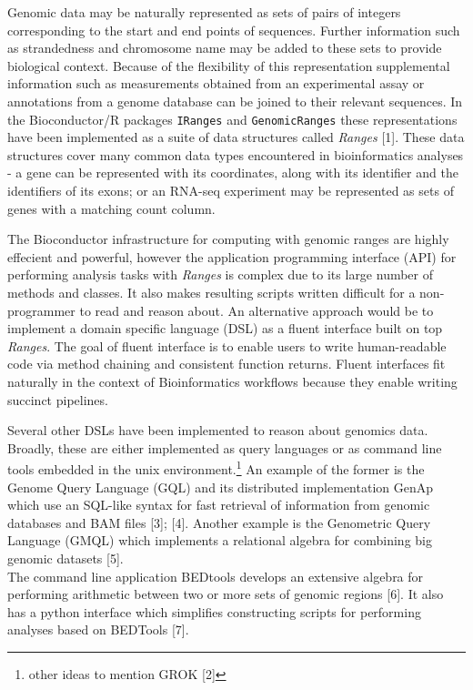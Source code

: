 \documentclass[10pt,letterpaper]{article}
\begin{document}
Genomic data may be naturally represented as sets of pairs of integers
corresponding to the start and end points of sequences. Further
information such as strandedness and chromosome name may be added to
these sets to provide biological context. Because of the flexibility of
this representation supplemental information such as measurements
obtained from an experimental assay or annotations from a genome
database can be joined to their relevant sequences. In the
Bioconductor/R packages \texttt{IRanges} and \texttt{GenomicRanges}
these representations have been implemented as a suite of data
structures called \emph{Ranges} {[}1{]}. These data structures cover
many common data types encountered in bioinformatics analyses - a gene
can be represented with its coordinates, along with its identifier and
the identifiers of its exons; or an RNA-seq experiment may be
represented as sets of genes with a matching count column.

The Bioconductor infrastructure for computing with genomic ranges are
highly effecient and powerful, however the application programming
interface (API) for performing analysis tasks with \emph{Ranges} is
complex due to its large number of methods and classes. It also makes
resulting scripts written difficult for a non-programmer to read and
reason about. An alternative approach would be to implement a domain
specific language (DSL) as a fluent interface built on top
\emph{Ranges}. The goal of fluent interface is to enable users to write
human-readable code via method chaining and consistent function returns.
Fluent interfaces fit naturally in the context of Bioinformatics
workflows because they enable writing succinct pipelines.

Several other DSLs have been implemented to reason about genomics data.
Broadly, these are either implemented as query languages or as command
line tools embedded in the unix environment.\footnote{other ideas to
  mention GROK {[}2{]}} An example of the former is the Genome Query
Language (GQL) and its distributed implementation GenAp which use an
SQL-like syntax for fast retrieval of information from genomic databases
and BAM files {[}3{]}; {[}4{]}. Another example is the Genometric Query
Language (GMQL) which implements a relational algebra for combining big
genomic datasets {[}5{]}.\\
The command line application BEDtools develops an extensive algebra for
performing arithmetic between two or more sets of genomic regions
{[}6{]}. It also has a python interface which simplifies constructing
scripts for performing analyses based on BEDTools {[}7{]}.
\end{document}
